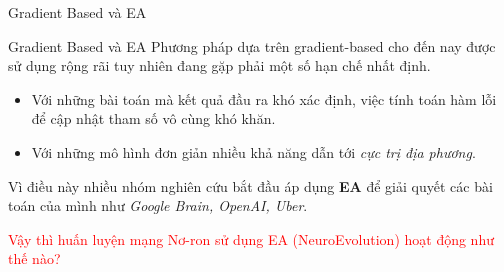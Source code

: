 	\begin{frame}{Gradient Based và EA}
	    \begin{block}{Gradient Based và EA}
		    Phương pháp dựa trên gradient-based cho đến nay được sử dụng rộng rãi tuy nhiên đang gặp phải một số hạn chế nhất định.
		    \begin{itemize}
		        \setlength\itemsep{0.01em}
		        \item Với những bài toán mà kết quả đầu ra khó xác định, việc tính toán hàm lỗi để cập nhật tham số vô cùng khó khăn.
		        \item Với những mô hình đơn giản nhiều khả năng dẫn tới \emph{cực trị địa phương}.
		    \end{itemize}
		    Vì điều này nhiều nhóm nghiên cứu bắt đầu áp dụng \textbf{EA} để giải quyết các bài toán của mình như \emph{Google Brain, OpenAI, Uber}.  
		\end{block}\pause
		\begin{block}{}
		    \textcolor{red}{Vậy thì huấn luyện mạng Nơ-ron sử dụng EA (NeuroEvolution) hoạt động như thế nào?}
		\end{block}
	\end{frame}
